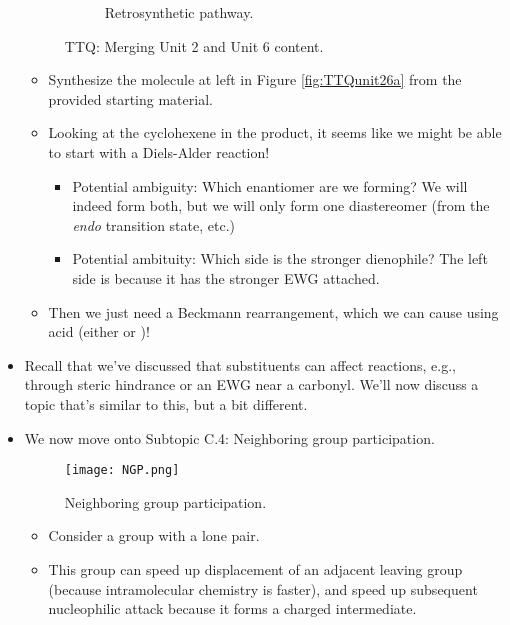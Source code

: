 \documentclass[../notes.tex]{subfiles}
\begin{document}
\begin{itemize}
\begin{figure}[h!]
\begin{subfigure}[b]{\linewidth}
                \arrow{->[\chemfig[atom sep=1.4em]{*6([:-120]=-=)}]}
                \arrow{->[acid]}
            \schemestop
            \caption{Retrosynthetic pathway.}
            \label{fig:TTQunit26b}
        \end{subfigure}
        \caption{TTQ: Merging Unit 2 and Unit 6 content.}
        \label{fig:TTQunit26}
    \end{figure}
    \begin{itemize}
        \item Synthesize the molecule at left in Figure \ref{fig:TTQunit26a} from the provided starting material.
        \item Looking at the cyclohexene in the product, it seems like we might be able to start with a Diels-Alder reaction!
        \begin{itemize}
            \item Potential ambiguity: Which enantiomer are we forming? We will indeed form both, but we will only form one diastereomer (from the \emph{endo} transition state, etc.)
            \item Potential ambituity: Which side is the stronger dienophile? The left side is because it has the stronger EWG attached.
        \end{itemize}
        \item Then we just need a Beckmann rearrangement, which we can cause using acid (either  or )!
    \end{itemize}
    \item Recall that we've discussed that substituents can affect reactions, e.g., through steric hindrance or an EWG near a carbonyl. We'll now discuss a topic that's similar to this, but a bit different.
    \item We now move onto Subtopic C.4: Neighboring group participation.
    \begin{figure}[h!]
        \centering
        \texttt{[image: NGP.png]}
        \caption{Neighboring group participation.}
        \label{fig:NGP}
    \end{figure}
    \pagebreak
    \begin{itemize}
        \item Consider a group with a lone pair.
        \item This group can speed up displacement of an adjacent leaving group (because intramolecular chemistry is faster), and speed up subsequent nucleophilic attack because it forms a charged intermediate.

\end{itemize}
\end{itemize}
\end{document}
